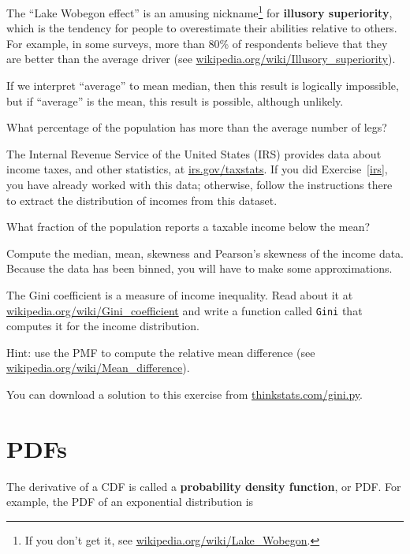 \documentclass[12pt]{book}
\begin{document}
\begin{ex}

The ``Lake Wobegon effect'' is an amusing nickname\footnote{If you
  don't get it, see \url{wikipedia.org/wiki/Lake_Wobegon}.} for {\bf
  illusory superiority}, which is the tendency for people to
overestimate their abilities relative to others.  For example, in some
surveys, more than 80\% of respondents believe that they are better
than the average driver (see
  \url{wikipedia.org/wiki/Illusory_superiority}).

If we interpret ``average'' to mean median, then this result is
logically impossible, but if ``average'' is the mean, this result is
possible, although unlikely.

What percentage of the population has more than the average number
of legs?

\end{ex}


\begin{ex}
The Internal Revenue Service of the United States (IRS) provides data
about income taxes, and other statistics, at \url{irs.gov/taxstats}.
If you did Exercise~\ref{irs}, you have already worked with this data;
otherwise, follow the instructions there to extract the distribution
of incomes from this dataset.

What fraction of the population reports a taxable income below the
mean?

Compute the median, mean, skewness and Pearson's skewness of the income
data.  Because the data has been binned, you will have to make
some approximations.

The Gini coefficient is a measure of income inequality.
Read about it at \url{wikipedia.org/wiki/Gini_coefficient} and write a
function called {\tt Gini} that computes it for the income
distribution.

Hint: use the PMF to compute the relative mean difference
(see \url{wikipedia.org/wiki/Mean_difference}).

You can download a solution to this exercise from \url{thinkstats.com/gini.py}.

\end{ex}


\section{PDFs}
\label{density}

The derivative of a CDF is called a {\bf probability density function},
or PDF.  For example, the PDF of an exponential distribution is
\end{document}
